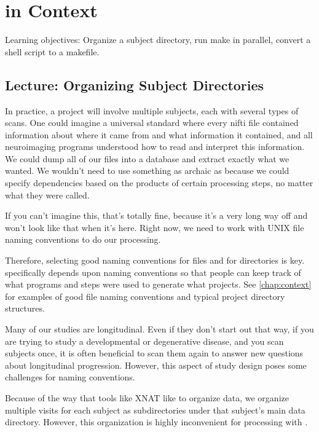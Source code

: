 \chapter{\maken{} in Context}
\label{sec:practicum2}
Learning objectives: Organize a subject directory, run make in parallel, convert a shell script to a makefile.
\section{Lecture: Organizing Subject Directories}

In practice, a project will involve multiple subjects, each with
several types of scans. One could imagine a universal standard where
every nifti file contained information about where it came from and
what information it contained, and all neuroimaging programs
understood how to read and interpret this information. We could dump
all of our files into a database and extract exactly what we
wanted. We wouldn't need to use something as archaic as \maken{} because
we could specify dependencies based on the products of certain
processing steps, no matter what they were called.

If you can't imagine this, that's totally fine, because it's a very
long way off and won't look like that when it's here. Right now, we
need to work with UNIX file naming conventions to do our processing.

Therefore, selecting good naming conventions for files and for
directories is key. \maken{} specifically depends upon naming
conventions so that people can keep track of what programs and steps
were used to generate what projects. See \autoref{chap:context} for examples of good file naming conventions and typical project directory structures. 


Many of our studies are longitudinal. Even if they don't start out
that way, if you are trying to study a developmental or degenerative
disease, and you scan subjects once, it is often beneficial to scan
them again to answer new questions about longitudinal
progression. However, this aspect of study design poses some
challenges for naming conventions. 

Because of the way that tools like XNAT like to organize data, we
organize multiple visits for each subject as subdirectories under that
subject's main data directory. However, this organization is highly
inconvenient for processing with \maken{}.  

